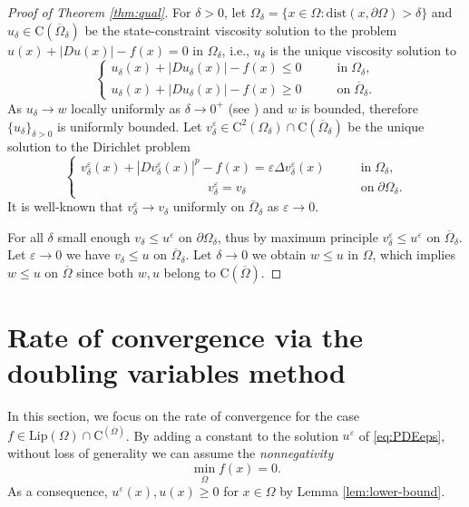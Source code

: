 \documentclass[11pt,reqno]{amsart}
\numberwithin{figure}{section}
\theoremstyle{plain}
\theoremstyle{remark}
\numberwithin{equation}{section}
\newcommand{\rmC}{\mathrm{C}}
\begin{document}
\begin{proof}[Proof of Theorem \ref{thm:qual}]
For $\delta>0$, let $\Omega_\delta = \{x\in \Omega: \mathrm{dist}(x,\partial \Omega) > \delta\}$ and $u_\delta\in\rmC(\overline{\Omega}_\delta)$ be the state-constraint viscosity solution to the problem $  u(x) + |Du(x)| - f(x) = 0$ in $\Omega_\delta$, i.e., $u_\delta$ is the unique viscosity solution to
\begin{equation}\label{e:v_v}
    \begin{cases}
      u_\delta(x) + |Du_\delta(x)|-f(x) \leq 0 &\qquad\text{in}\;\Omega_\delta,\\
      u_\delta(x) + |Du_\delta(x)| - f(x) \geq 0 &\qquad\text{on}\;\overline{\Omega}_\delta.
    \end{cases}
\end{equation}
As $u_\delta\rightarrow w$ locally uniformly as $\delta\rightarrow 0^+$ (see \cite{kim_state-constraint_2020}) and $w$ is bounded, therefore $\{u_\delta\}_{\delta>0}$ is uniformly bounded. Let $v^\varepsilon_\delta\in \rmC^2(\Omega_\delta)\cap \rmC(\overline{\Omega}_\delta)$ be the unique solution to the Dirichlet problem
\begin{equation}\label{eq:vv_eps}
\begin{cases}
      v_\delta^\varepsilon(x) + |Dv_\delta^\varepsilon(x)|^p - f(x) = \varepsilon \Delta v_\delta^\varepsilon(x) &\qquad\text{in}\;\Omega_\delta,\\
    \;\;\;\,\quad\qquad\qquad\qquad\qquad v_\delta^\varepsilon = v_\delta &\qquad \text{on}\;\partial\Omega_\delta.
\end{cases}
\end{equation}
It is well-known that $v^\varepsilon_\delta\to v_\delta$ uniformly on $\overline{\Omega}_\delta$ as $\varepsilon\to 0$.

For all $\delta$ small enough $v_\delta\leq u^\varepsilon$ on $\partial \Omega_\delta$, thus by maximum principle $v^\varepsilon_\delta \leq u^\varepsilon$ on $\overline{\Omega}_\delta$. Let $\varepsilon\to 0$ we have $v_\delta \leq u$ on $\overline{\Omega}_\delta$.
Let $\delta\rightarrow 0$ we obtain $w\leq u$ in $\Omega$, which implies $w\leq u$ on $\overline{\Omega}$ since both $w,u$ belong to $\rmC(\overline{\Omega})$.
\end{proof}


\section{Rate of convergence via the doubling variables method}
In this section, we focus on the rate of convergence for the case $f\in \mathrm{Lip}(\Omega)\cap\mathrm{C}^(\overline{\Omega})$. By adding a constant to the solution $u^\varepsilon$ of \eqref{eq:PDEeps}, without loss of generality we can assume the \emph{nonnegativity}
\begin{equation}\label{e:minf}
    \min_{\overline{\Omega}} f(x) = 0.
\end{equation}
As a consequence, $u^\varepsilon(x),u(x)\geq 0$ for $x\in \Omega$ by Lemma \ref{lem:lower-bound}.
\end{document}
